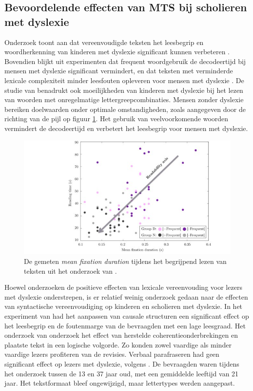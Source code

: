 \subsection{Bevoordelende effecten van MTS bij scholieren met dyslexie}

Onderzoek toont aan dat vereenvoudigde teksten het leesbegrip en woordherkenning van kinderen met dyslexie significant kunnen verbeteren \autocite{RiveroContreras2021}. Bovendien blijkt uit experimenten dat frequent woordgebruik de decodeertijd bij mensen met dyslexie significant vermindert, en dat teksten met verminderde lexicale complexiteit minder leesfouten opleveren voor mensen met dyslexie \autocite{Rello2013a, Gala2016}. De studie van \textcite{Gala2016} benadrukt ook moeilijkheden van kinderen met dyslexie bij het lezen van woorden met onregelmatige lettergreepcombinaties. Mensen zonder dyslexie bereiken doelwaarden onder optimale omstandigheden, zoals aangegeven door de richting van de pijl op figuur \ref{img:readability-mean-fixation-duration}. Het gebruik van veelvoorkomende woorden vermindert de decodeertijd en verbetert het leesbegrip voor mensen met dyslexie.

\begin{figure}
\includegraphics[width=\linewidth]{img/readability-mean-fixation-duration.png}
\caption{De gemeten \textit{mean fixation duration} tijdens het begrijpend lezen van teksten uit het onderzoek van \textcite{Rello2013a}.}
\label{img:readability-mean-fixation-duration}
\end{figure}

Hoewel onderzoeken de positieve effecten van lexicale vereenvouding voor lezers met dyslexie onderstrepen, is er relatief weinig onderzoek gedaan naar de effecten van syntactische vereenvoudiging op kinderen en scholieren met dyslexie. In het experiment van \textcite{Linderholm2000} had het aanpassen van causale structuren een significant effect op het leesbegrip en de foutenmarge van de bevraagden met een lage leesgraad. Het onderzoek van \textcite{Leroy2013} onderzoek het effect van herstelde coherentieonderbrekingen en plaatste tekst in een logische volgorde. Zo konden zowel vaardige als minder vaardige lezers profiteren van de revisies. Verbaal parafraseren had geen significant effect op lezers met dyslexie, volgens \textcite{Rello2013c}. De bevraagden waren tijdens het onderzoek tussen de 13 en 37 jaar oud, met een gemiddelde leeftijd van 21 jaar. Het tekstformaat bleef ongewijzigd, maar lettertypes werden aangepast.


